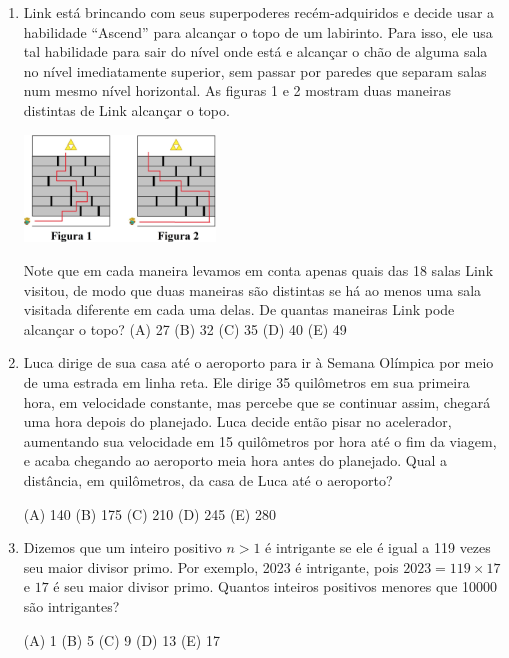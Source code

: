 \documentclass[12pt]{article}
\begin{document}
\begin{enumerate}[label=\textbf{{\arabic*.}}]
(A) 9 cm$^{2}$ (B) 7 cm$^{2}$ (C) 6 cm$^{2}$ (D) 5 cm$^{2}$ (E) 3 cm$^{2}$

\item Link está brincando com seus superpoderes recém-adquiridos e decide usar a habilidade “Ascend” para alcançar o topo de um labirinto. Para isso, ele usa tal habilidade para sair do nível onde está e alcançar o chão de alguma sala no nível imediatamente superior, sem passar por paredes que separam salas num mesmo nível horizontal. As figuras 1 e 2 mostram duas maneiras distintas de Link alcançar o topo.

    \begin{center}
    \includegraphics[width=0.4\textwidth]{fourth.png}
  \end{center}


Note que em cada maneira levamos em conta apenas quais das 18 salas Link visitou, de modo que duas maneiras são distintas se há ao menos uma sala visitada diferente em cada uma delas. De quantas maneiras Link pode alcançar o topo?
(A) 27 (B) 32 (C) 35 (D) 40 (E) 49

\item Luca dirige de sua casa até o aeroporto para ir à Semana Olímpica por meio de uma estrada em linha reta. Ele dirige 35 quilômetros em sua primeira hora, em velocidade constante, mas percebe que se continuar assim, chegará uma hora depois do planejado. Luca decide então pisar no acelerador, aumentando sua velocidade em 15 quilômetros por hora até o fim da viagem, e acaba chegando ao aeroporto meia hora antes do planejado. Qual a distância, em quilômetros, da casa de Luca até o aeroporto?

(A) 140 (B) 175 (C) 210 (D) 245 (E) 280

\item Dizemos que um inteiro positivo $n>1$ é intrigante se ele é igual a 119 vezes seu maior divisor primo. Por exemplo, 2023 é intrigante, pois $2023 = 119 \times 17$ e $17$ é seu maior divisor primo. Quantos inteiros positivos menores que 10000 são intrigantes?

(A) 1 (B) 5 (C) 9 (D) 13 (E) 17


\end{enumerate}
\end{document}
